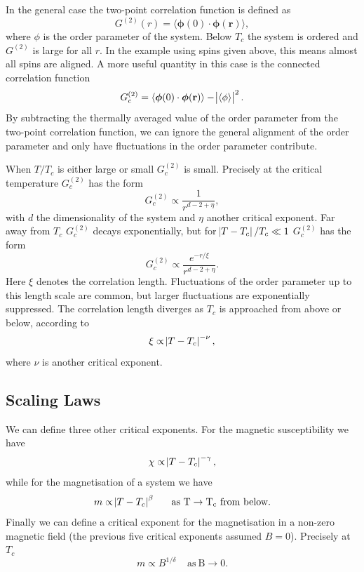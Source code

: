 \documentclass[11pt, a4paper]{report} %
\begin{document}
In the general case the two-point correlation function is defined as
\begin{equation}
	G^{(2)}(r) = \langle \boldsymbol{\phi}(0) \cdot \boldsymbol{\phi}(\mathbf{r}) \rangle,
\end{equation}
where \(\phi\) is the order parameter of the system.
Below \(T_c\) the system is ordered and \(G^{(2)}\) is large for all \(r\).
In the example using spins given above, this means almost all spins are aligned.
A more useful quantity in this case is the connected correlation function
\begin{equation}
	G_c^{(2)} = \langle \boldsymbol{\phi}(0) \cdot \boldsymbol{\phi}(\mathbf{r}) \rangle - \abs{\langle \phi \rangle}^2.
\end{equation}
By subtracting the thermally averaged value of the order parameter from the two-point correlation function, we can ignore the general alignment of the order parameter and only have fluctuations in the order parameter contribute.

When \(T/T_c\) is either large or small \(G_c^{(2)}\) is small.
Precisely at the critical temperature \(G_c^{(2)}\) has the form
\begin{equation}
	G_c^{(2)} \propto \frac{1}{r^{d-2+\eta}},
\end{equation}
with \(d\) the dimensionality of the system and \(\eta\) another critical exponent.
Far away from \(T_c\) \(G_c^{(2)}\) decays exponentially, but for \(\abs{T-T_c} / T_c \ll 1\) \(G_c^{(2)}\) has the form
\begin{equation}
	G_c^{(2)} \propto \frac{e^{-r/\xi}}{r^{d-2+\eta}}.
\end{equation}
Here \(\xi\) denotes the correlation length.
Fluctuations of the order parameter up to this length scale are common, but larger fluctuations are exponentially suppressed.
The correlation length diverges as \(T_c\) is approached from above or below, according to
\begin{equation}
	\label{eq:correlation_length}
	\xi \propto \abs{T-T_c}^{-\nu},
\end{equation}
where \(\nu\) is another critical exponent.

\subsection{Scaling Laws}\label{sec:scaling_laws}
We can define three other critical exponents.
For the magnetic susceptibility we have
\begin{equation}
	\label{eq:chi_divergence}
	\chi \propto \abs{T-T_c}^{-\gamma},
\end{equation}
while for the magnetisation of a system we have
\begin{equation}
	\label{eq:magnetization_beta}
	m \propto \abs{T-T_c}^{\beta} \mathrm{\ \ \ \ \ as\ T \to T_c\ from\ below}.
\end{equation}
Finally we can define a critical exponent for the magnetisation in a non-zero magnetic field (the previous five critical exponents assumed \(B=0\)).
Precisely at \(T_c\)
\begin{equation}
	m \propto B^{1/\delta} \mathrm{\ \ \ \ \ as\ B \to 0}.
\end{equation}
\end{document}
